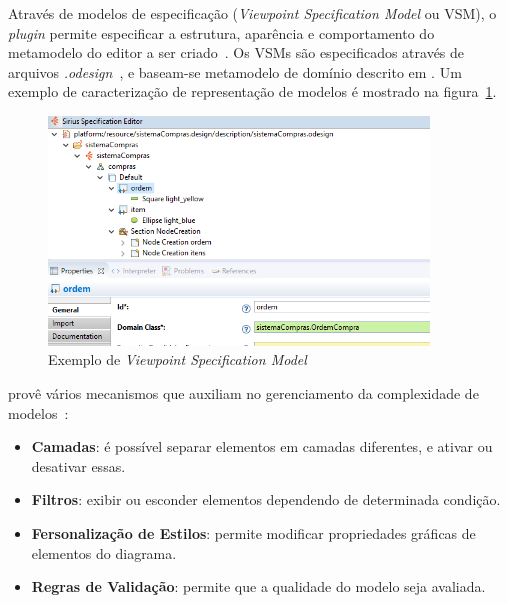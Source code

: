 Através de modelos de especificação (\textit{Viewpoint Specification Model} ou VSM), o \textit{plugin} permite especificar a estrutura, aparência e comportamento do metamodelo do editor a ser criado~\cite{viyovic2014sirius}. Os VSMs são especificados através de arquivos \textit{.odesign}~\cite{viyovic2014sirius}, e baseam-se metamodelo de domínio descrito em \ecore. Um exemplo de caracterização de representação de modelos é mostrado na figura~\ref{exemplo-sirius}.

\begin{figure}[h]
	\centering
	\includegraphics[width=0.9\textwidth]{figuras/exemplos-emf/exemplo-sirius-vsm.png}
	\caption{Exemplo de \textit{Viewpoint Specification Model}}
	\label{exemplo-sirius}
\end{figure}

\sirius provê vários mecanismos que auxiliam no gerenciamento da complexidade de modelos~\cite{madiot2015eclipse}:

\begin{itemize}
	\item \textbf{Camadas}: é possível separar elementos em camadas diferentes, e ativar ou desativar essas.
	\item \textbf{Filtros}: exibir ou esconder elementos dependendo de determinada condição.
	\item \textbf{Fersonalização de Estilos}: permite modificar propriedades gráficas de elementos do diagrama.
	\item \textbf{Regras de Validação}: permite que a qualidade do modelo seja avaliada.
\end{itemize}

